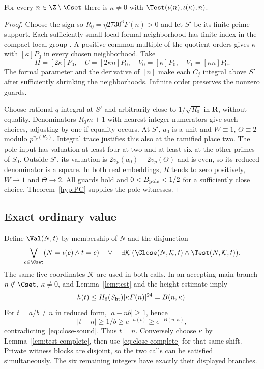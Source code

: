 \begin{lemma}\label{lem:test-complete}
For every $n\in\Z\setminus\Cset$ there is
$\kappa\ne0$ with $\Test(\iota(n),\iota(\kappa),n)$.
\end{lemma}
\begin{proof}
Choose the sign so $R_0=\eta2730^6F(n)>0$ and let $S'$ be its finite
prime support. Each sufficiently small local formal neighborhood has
finite index in the compact local group
\cite[VII.6.3, p.~200]{silverman}. A positive common multiple
of the quotient orders gives $\kappa$ with $[\kappa]P_0$ in every
chosen neighborhood. Take
\[
 H=[2\kappa]P_0,\quad U=[2\kappa n]P_0,\quad
 V_0=[\kappa]P_0,\quad V_1=[\kappa n]P_0.
\]
The formal parameter and the derivative of $[n]$ make each $C_j$
integral above $S'$ after sufficiently shrinking the neighborhoods.
Infinite order preserves the nonzero guards.

Choose rational $q$ integral at $S'$ and arbitrarily close to
$1/\sqrt{R_0}$ in $\mathbf R$, without equality. Denominators
$R_0m+1$ with nearest integer numerators give such choices, adjusting
by one if equality occurs. At $S'$, $a_0$ is a unit and
$W\equiv1$, $\Theta\equiv2$ modulo $p^{v_p(R_0)}$.
Integral trace justifies this also at the ramified place two.
The pole input has valuation at least four at two and at least six
at the other primes of $S_0$. Outside $S'$, its valuation is
$2v_p(a_0)-2v_p(\Theta)$ and is even, so its reduced denominator is
a square. In both real embeddings, $R$ tends to zero positively,
$W\to1$ and $\Theta\to2$. All guards hold and
$0<B_{\rm pole}<1/2$ for a sufficiently close choice.
Theorem~\ref{hyp:PC} supplies the pole witnesses.
\end{proof}

\subsection{Exact ordinary value}
Define $\Val(N,t)$ by membership of $N$ and the disjunction
\[
 \bigvee_{c\in\Cset}(N=\iota(c)\wedge t=c)
 \quad\vee\quad
 \exists\mathcal K\,
 (\Close(N,\mathcal K,t)\wedge\Test(N,\mathcal K,t)).
\]
The same five coordinates $\mathcal K$ are used in both calls.
In an accepting main branch $n\notin\Cset$, $\kappa\ne0$, and
Lemma~\ref{lem:test} and the height estimate imply
\[
 h(t)\le H_6(S_{\rm ht})|\kappa F(n)|^{24}=B(n,\kappa).
\]
For $t=a/b\ne n$ in reduced form, $|a-nb|\ge1$, hence
\[
 |t-n|\ge1/b\ge e^{-h(t)}\ge e^{-B(n,\kappa)},
\]
contradicting~\eqref{eq:close-sound}. Thus $t=n$.
Conversely choose $\kappa$ by Lemma~\ref{lem:test-complete}, then use
\eqref{eq:close-complete} for that same shift. Private witness blocks
are disjoint, so the two calls can be satisfied simultaneously.
The six remaining integers have exactly their displayed branches.

